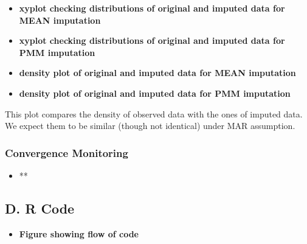 \documentclass[12pt,]{article}
\providecommand{\tightlist}{%
  \setlength{\itemsep}{0pt}\setlength{\parskip}{0pt}}
\begin{document}
\begin{itemize}
\item
  \textbf{xyplot checking distributions of original and imputed data for
  MEAN imputation}
\item
  \textbf{xyplot checking distributions of original and imputed data for
  PMM imputation}
\item
  \textbf{density plot of original and imputed data for MEAN imputation}
\item
  \textbf{density plot of original and imputed data for PMM imputation}
\end{itemize}

This plot compares the density of observed data with the ones of imputed
data. We expect them to be similar (though not identical) under MAR
assumption.

\subsubsection{Convergence Monitoring}\label{convergence-monitoring}

\begin{itemize}
\tightlist
\item
  **
\end{itemize}

\subsection{D. R Code}\label{d.-r-code}

\begin{itemize}
\tightlist
\item
  \textbf{Figure showing flow of code}
\end{itemize}

\newpage


\end{document}
